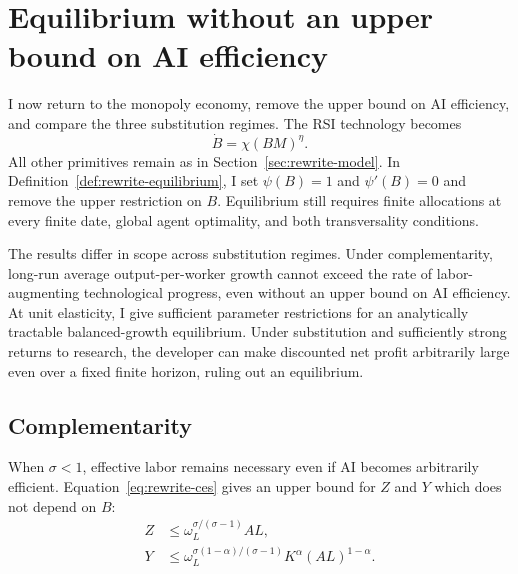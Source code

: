 \section{Equilibrium without an upper bound on AI efficiency}
\label{sec:rewrite-uncapped}

I now return to the monopoly economy, remove the upper bound on AI efficiency, and compare the three
substitution regimes. The RSI technology becomes
\begin{equation}
 \dot B=\chi(BM)^\eta.
 \label{eq:rewrite-uncapped-unit-law}
\end{equation}
All other primitives remain as in Section~\ref{sec:rewrite-model}.
In Definition~\ref{def:rewrite-equilibrium}, I set $\psi(B)=1$ and
$\psi'(B)=0$ and remove the upper restriction on $B$. Equilibrium still
requires finite allocations at every finite date, global agent optimality,
and both transversality conditions. %

The results differ in scope across substitution regimes. Under complementarity, long-run average output-per-worker growth cannot exceed the rate of labor-augmenting technological progress, even without an upper bound on AI efficiency. At unit elasticity, I give sufficient parameter restrictions for an analytically tractable balanced-growth equilibrium. Under substitution and sufficiently strong returns to research, the developer can make discounted net profit arbitrarily large even over a fixed finite horizon, ruling out an equilibrium.

\subsection{Complementarity}
\label{subsec:rewrite-uncapped-complements}

When $\sigma<1$, effective labor remains necessary even if AI becomes arbitrarily efficient. Equation~\eqref{eq:rewrite-ces} gives an upper bound for $Z$ and $Y$ which does not depend on $B$:
\begin{align}
 Z&\leq\omega_L^{\sigma/(\sigma-1)}AL,
 \label{eq:rewrite-uncapped-complements-z-bound}\\
 Y&\leq\omega_L^{\sigma(1-\alpha)/(\sigma-1)}
 K^\alpha(AL)^{1-\alpha}.
 \label{eq:rewrite-uncapped-complements-y-bound}
\end{align}

